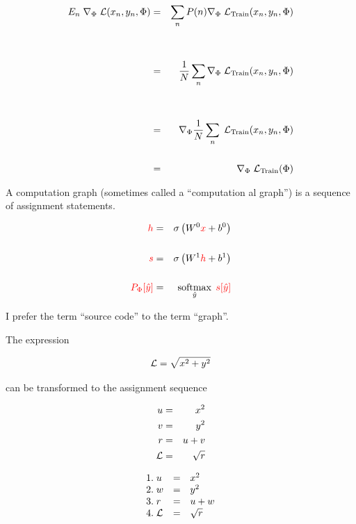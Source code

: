 {{\begin{eqnarray*}
  E_{n}\;\nabla_\Phi \; {\cal L}(x_n,y_n,\Phi) & = & \sum_n P(n) \nabla_\Phi\;{\cal L}_{\mathrm{Train}}(x_n,y_n,\Phi) \\
  \\
  \\ & = & \frac{1}{N} \sum_n \nabla_\Phi\;{\cal L}_{\mathrm{Train}}(x_n,y_n,\Phi) \\
  \\
    \\ & = & \nabla_\Phi \frac{1}{N} \sum_n \;{\cal L}_{\mathrm{Train}}(x_n,y_n,\Phi) \\
  \\
  &  = & \nabla_\Phi\;{\cal L}_{\mathrm{Train}}(\Phi)
\end{eqnarray*}
}


A computation graph (sometimes called a ``computation{\color{red} al} graph'') is a sequence of assignment statements.


\begin{eqnarray*}
  {\color{red} h} & = & \sigma\left(W^0{\color{red} x} + b^0\right) \\
  \\
  {\color{red} s} & = & \sigma\left(W^1{\color{red} h} + b^1 \right) \\
  \\
  {\color{red} P_\Phi[\hat{y}]} & = & \operatorname*{softmax}_{\hat{y}}\;{\color{red} s[\hat{y}]}
\end{eqnarray*}

\vfill
I prefer the term ``source code'' to the term ``graph''.


The expression

\vfill
{\color{red} $${\cal L} = \sqrt{x^2 + y^2}$$}

\vfill
can be transformed to the assignment sequence

{\color{red}
\vfill
\begin{eqnarray*}
  u & = & x^2  \\
  v & = & y^2 \\
  r & =& u + v \\
  {\cal L} & = & \sqrt{r}
\end{eqnarray*}
}

\vspace{-1ex}
{\color{red}
$$\begin{array}{lcl}
 1.\;u & = & x^2  \\
 2.\;w & = & y^2 \\
 3.\;r & =& u + w \\
  4.\;{\cal L} & = & \sqrt{r}
\end{array}$$
}

}
